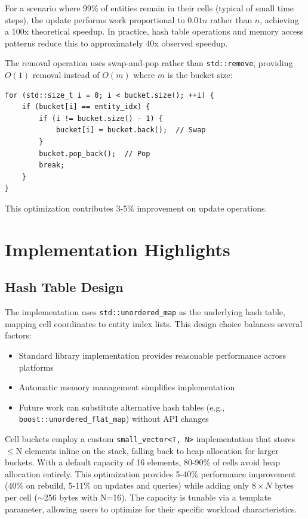 \documentclass[11pt]{article}
\begin{document}
For a scenario where 99\% of entities remain in their cells (typical of small time steps), the update performs work proportional to $0.01n$ rather than $n$, achieving a 100x theoretical speedup. In practice, hash table operations and memory access patterns reduce this to approximately 40x observed speedup.

The removal operation uses swap-and-pop rather than \texttt{std::remove}, providing $O(1)$ removal instead of $O(m)$ where $m$ is the bucket size:

\begin{lstlisting}[caption={Swap-and-pop removal optimization}]
for (std::size_t i = 0; i < bucket.size(); ++i) {
    if (bucket[i] == entity_idx) {
        if (i != bucket.size() - 1) {
            bucket[i] = bucket.back();  // Swap
        }
        bucket.pop_back();  // Pop
        break;
    }
}
\end{lstlisting}

This optimization contributes 3-5\% improvement on update operations.

\section{Implementation Highlights}

\subsection{Hash Table Design}

The implementation uses \texttt{std::unordered\_map} as the underlying hash table, mapping cell coordinates to entity index lists. This design choice balances several factors:

\begin{itemize}
\item Standard library implementation provides reasonable performance across platforms
\item Automatic memory management simplifies implementation
\item Future work can substitute alternative hash tables (e.g., \texttt{boost::unordered\_flat\_map}) without API changes
\end{itemize}

Cell buckets employ a custom \texttt{small\_vector<T, N>} implementation that stores $\leq$N elements inline on the stack, falling back to heap allocation for larger buckets. With a default capacity of 16 elements, 80-90\% of cells avoid heap allocation entirely. This optimization provides 5-40\% performance improvement (40\% on rebuild, 5-11\% on updates and queries) while adding only $8\times N$ bytes per cell ($\sim$256 bytes with N=16). The capacity is tunable via a template parameter, allowing users to optimize for their specific workload characteristics.
\end{document}
